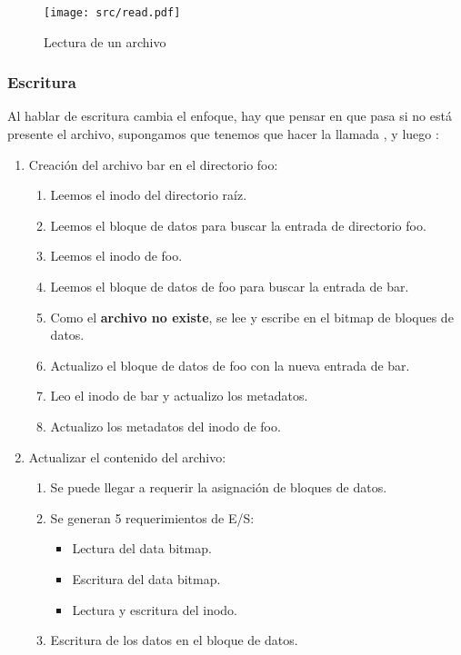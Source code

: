 \documentclass[openany]{book}
\begin{document}
\begin{figure}[h]
    \centering
    \texttt{[image: src/read.pdf]}
    \caption{Lectura de un archivo}
\end{figure}

\subsubsection{Escritura}

Al hablar de escritura cambia el enfoque, hay que pensar en que pasa si no está presente el archivo, supongamos que tenemos que hacer la llamada , y luego : 

\begin{enumerate}
    \item Creación del archivo bar en el directorio foo:
    \begin{enumerate}
        \item Leemos el inodo del directorio raíz.
        \item Leemos el bloque de datos para buscar la entrada de directorio foo.
        \item Leemos el inodo de foo.
        \item Leemos el bloque de datos de foo para buscar la entrada de bar.
        \item Como el \textbf{archivo no existe}, se lee y escribe en el bitmap de bloques de datos.
        \item Actualizo el bloque de datos de foo con la nueva entrada de bar.
        \item Leo el inodo de bar y actualizo los metadatos.
        \item Actualizo los metadatos del inodo de foo.
    \end{enumerate}
    \item Actualizar el contenido del archivo:
    \begin{enumerate}
        \item Se puede llegar a requerir la asignación de bloques de datos.
        \item Se generan 5 requerimientos de E/S:
        \begin{itemize}
            \item Lectura del \colorbox{green!20}{data bitmap}.
            \item Escritura del \colorbox{green!20}{data bitmap}.
            \item Lectura y escritura del inodo.
        \end{itemize}
        \item Escritura de los datos en el bloque de datos.
    \end{enumerate}
\end{enumerate}
\end{document}
